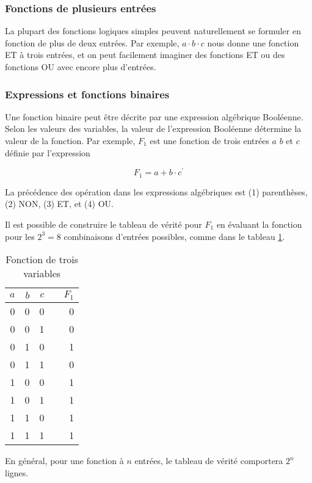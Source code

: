 \documentclass[11pt]{article}
\begin{document}
\subsubsection{Fonctions de plusieurs entrées}
\label{sec:org1da3ba6}

La plupart des fonctions logiques simples peuvent naturellement se
formuler en fonction de plus de deux entrées. Par exemple, \(a \cdot b
\cdot c\) nous donne une fonction ET à trois entrées, et on peut
facilement imaginer des fonctions ET ou des fonctions OU avec encore
plus d'entrées.

\subsubsection{Expressions et fonctions binaires}
\label{sec:org5fe4f6a}

Une fonction binaire peut être décrite par une expression algébrique
Booléenne. Selon les valeurs des variables, la valeur de l'expression
Booléenne détermine la valeur de la fonction. Par exemple, \(F_1\) est
une fonction de trois entrées \(a\) \(b\) et \(c\) définie par
l'expression

$$ F_1 = a + b \cdot c^\prime $$

La précédence des opération dans les expressions algébriques est (1)
parenthèses, (2) NON, (3) ET, et (4) OU.

Il est possible de construire le tableau de vérité pour \(F_1\) en
évaluant la fonction pour les \(2^3 = 8\) combinaisons d'entrées
possibles, comme dans le tableau \ref{tab:org3ad60f1}.

\begin{table}[htbp]
\caption{\label{tab:org3ad60f1}Fonction de trois variables}
\centering
\begin{tabular}{rrrlr}
\(a\) & \(b\) & \(c\) &  & \(F_1\)\\
\hline
0 & 0 & 0 &  & 0\\
0 & 0 & 1 &  & 0\\
0 & 1 & 0 &  & 1\\
0 & 1 & 1 &  & 0\\
1 & 0 & 0 &  & 1\\
1 & 0 & 1 &  & 1\\
1 & 1 & 0 &  & 1\\
1 & 1 & 1 &  & 1\\
\end{tabular}
\end{table}

En général, pour une fonction à \(n\) entrées, le tableau de vérité
comportera \(2^n\) lignes.
\end{document}
